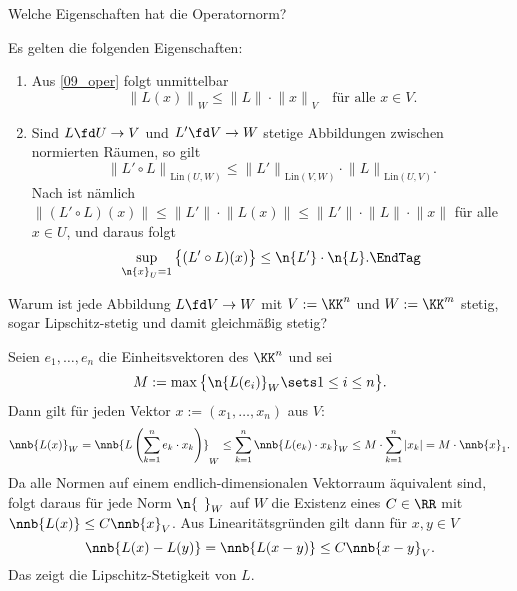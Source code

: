 \begin{frage}
  Welche Eigenschaften hat die Operatornorm?
\end{frage}

\begin{antwort}
  Es gelten die folgenden Eigenschaften:
  {\setlength{\labelsep}{5mm}
    \begin{enumerate}
    \item[\desc{i}] Aus \ref{09_oper} {\astastref} folgt unmittelbar 
      \[
      {\| L(x) \|}_W \le {\| L \|} \cdot {\| x\|}_V \quad\text{für alle $x\in V$}.
      \]
    \item[\desc{ii}] Sind $L\fd U \to V$ und $L' \fd V \to W$ stetige 
      Abbildungen zwischen normierten Räumen, so gilt 
      \[
      {\| L' \circ L \| }_{\mathrm{Lin}( U,W )}\le 
      {\| L'\| }_{\mathrm{Lin}( V,W )}\cdot 
      {\| L \| }_{\mathrm{Lin}( U,V )}.
      \]
      Nach  ist nämlich  
      ${\| (L' \circ L)(x) \|} \le {\|L'\|} \cdot {\| L(x) \|} \le 
      {\|L'\|} \cdot {\|L\|} \cdot {\| x \|}$ 
      für alle $x\in U$, und daraus folgt
      \[
      \sup_{\n{x}_U=1} \big\{ (L'\circ L)(x) \big\} \le \n{L'}\cdot \n{L}.
      \EndTag
      \]
    \end{enumerate}}
\end{antwort}

\begin{frage}
  Warum ist jede  Abbildung 
  $L\fd V \to W$ mit $V := \KK^n$ und $W := \KK^m$ 
  stetig, sogar Lipschitz-stetig und damit gleichmäßig stetig?
\end{frage}

\begin{antwort}
  Seien $e_1, \ldots, e_n$ die Einheitsvektoren 
  des $\KK^n$ und sei 
  \[
  M := \max \big\{ \n{L( e_i )}_W \sets 1\le i \le n \big\}.
  \]
  Dann gilt für jeden Vektor $x := (x_1,\ldots,x_n)$ aus $V$:  
  \[
  \nnb{L(x)}_W = 
  \nnb{ L \left( \sum_{k=1}^n e_k \cdot x_k \right) }_W 
  \le \sum_{k=1}^n \nnb{ L(e_k) \cdot x_k }_W \le 
  M \cdot \sum_{k=1}^n \left|x_k\right| = 
  M \cdot \nnb{ x }_1.
  \] 
  Da alle Normen auf einem endlich-dimensionalen Vektorraum 
  äquivalent sind, folgt daraus für jede Norm 
  $\n{\,\;}_W$ auf $W$ die Existenz eines $C\in\RR$ mit 
  $\nnb{ L(x) } \le C \nnb{ x }_V$. Aus Linearitätsgründen 
  gilt dann für $x,y \in V$
  \[
  \nnb{ L(x)-L(y) } = \nnb{ L(x-y) } \le C \nnb{ x-y }_V.
  \]
  Das zeigt die Lipschitz-Stetigkeit von $L$. 
  \AntEnd    
\end{antwort}

